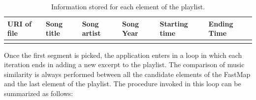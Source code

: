 \begin{center}
\begin{longtable}{| p{} | p{} | p{} | p{} | p{} | p{} |} 
\hline
URI of file & Song title & Song artist & Song Year & Starting time & Ending Time \\ \hline
\caption[Element of playlist]{Information stored for each element of the playlist.}
\label{table:playlistelements}
\end{longtable}
\end{center}

Once the first segment is picked, the application enters in a loop in which each iteration ends in adding a new excerpt to the playlist. The comparison of music similarity is always performed between all the candidate elements of the FastMap and the last element of the playlist. The procedure invoked in this loop can be summarized as follows:
